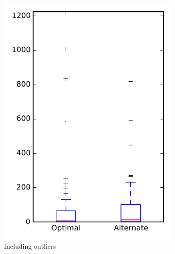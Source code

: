 
\begin{figure}
    \centering
    \begin{subfigure}{.4\textwidth}
        \centering
        \includegraphics[height=0.4\textheight]{figures/combo/flt_rq1_mahout}
        \caption{Including outliers}\label{fig:combo:flt:rq1:mahout_outlier}
    \end{subfigure}%
    \begin{subfigure}{.4\textwidth}
        \centering

\end{subfigure}
\end{figure}
